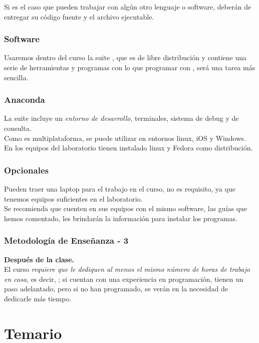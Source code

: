 \begin{frame}
Si es el caso que pueden trabajar con algún otro lenguaje o software, deberán de entregar su código fuente y el archivo ejecutable.
\end{frame}
\begin{frame}
\frametitle{Software}
Usaremos dentro del curso la suite , que es de libre distribución y contiene una serie de herramientas y programas con lo que programar con \textoazul{\python}, será una tarea más sencilla.
\end{frame}
\begin{frame}
\frametitle{Anaconda}
La suite incluye un \emph{entorno de desarrollo}, terminales, sistema de debug y de consulta.
\\
\bigskip
Como es multiplataforma, se puede utilizar en entornos linux, iOS y Windows. En los equipos del laboratorio tienen instalado linux y Fedora como distribución.
\end{frame}
\begin{frame}
\frametitle{Opcionales}
Pueden traer una laptop para el trabajo en el curso, no es requisito, ya que tenemos equipos suficientes en el laboratorio.
\\
\medskip
Se recomienda que cuenten en sus equipos con el mismo software, las guías que hemos comentado, les brindarán la información para instalar los programas.
\end{frame}
\begin{frame}
\frametitle{Metodología de Enseñanza - 3}
\textbf{Después de la clase.}
\\
\medskip
El curso \emph{requiere que le dediquen al menos el mismo número de horas de trabajo en casa}, es decir, ; si cuentan con una experiencia en programación, tienen un paso adelantado, pero si no han programado, se verán en la necesidad de dedicarle más tiempo.
\end{frame}
\section{Temario}
